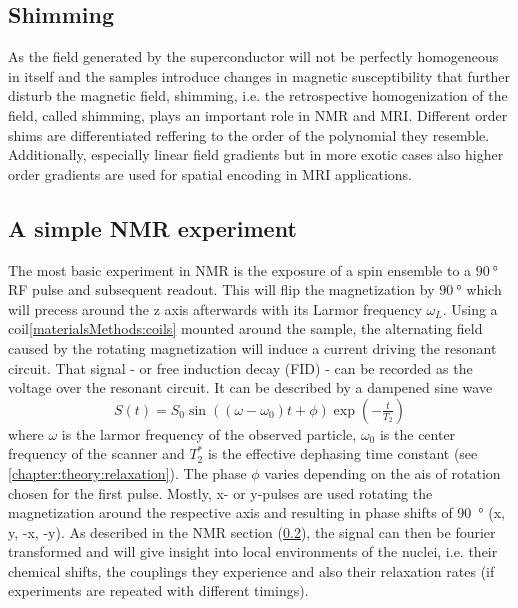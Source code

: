         \subsection{Shimming}
        As the field generated by the superconductor will not be perfectly homogeneous in itself and the samples introduce changes in magnetic susceptibility that further disturb the magnetic field, shimming, i.e. the retrospective homogenization of the field, called shimming, plays an important role in NMR and MRI. Different order shims are differentiated reffering to the order of the polynomial they resemble. Additionally, especially linear field gradients but in more exotic cases also higher order gradients are used for spatial encoding in MRI applications.
        \subsection{A simple NMR experiment}
        The most basic experiment in NMR is the exposure of a spin ensemble to a $\SI{90}{\degree}$ RF pulse and subsequent readout. This will flip the magnetization by $\SI{90}{\degree}$ which will precess around the z axis afterwards with its Larmor frequency $\omega_L$. Using a coil\ref{materialsMethods:coils} mounted around the sample, the alternating field caused by the rotating magnetization will induce a current driving the resonant circuit. That signal - or free induction decay (FID) - can be recorded as the voltage over the resonant circuit. It can be described by a dampened sine wave
        \begin{equation}
            S(t) = S_0 \sin((\omega - \omega_0)  t + \phi) \exp(-\tfrac{t}{T_2})
        \end{equation}
        where $\omega$ is the larmor frequency of the observed particle, $\omega_0$ is the center frequency of the scanner and $T_2^*$ is the effective dephasing time constant (see \ref{chapter:theory:relaxation}). The phase $\phi$ varies depending on the ais of rotation chosen for the first pulse. Mostly, x- or y-pulses are used rotating the magnetization around the respective axis and resulting in phase shifts of \SI{90}{\degree} (x, y, -x, -y). As described in the NMR section (\ref{}), the signal can then be fourier transformed and will give insight into local environments of the nuclei, i.e. their chemical shifts, the couplings they experience and also their relaxation rates (if experiments are repeated with different timings). 
